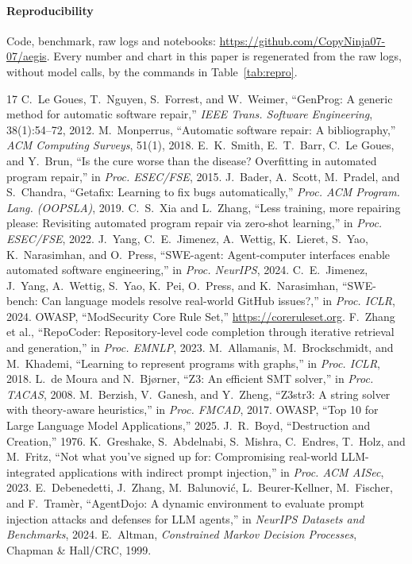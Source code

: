 \documentclass[journal]{IEEEtran}
\newcommand{\repolink}{\url{https://github.com/CopyNinja07-07/aegis}}
\begin{document}
\paragraph{Reproducibility} Code, benchmark, raw logs and notebooks: \repolink{}. Every number and chart in this paper is regenerated from the raw logs, without model calls, by the commands in Table~\ref{tab:repro}.


\begin{thebibliography}{17}
 C.~Le Goues, T.~Nguyen, S.~Forrest, and W.~Weimer, ``GenProg: A generic method for automatic software repair,'' \emph{IEEE Trans. Software Engineering}, 38(1):54--72, 2012.
 M.~Monperrus, ``Automatic software repair: A bibliography,'' \emph{ACM Computing Surveys}, 51(1), 2018.
 E.~K.~Smith, E.~T.~Barr, C.~Le Goues, and Y.~Brun, ``Is the cure worse than the disease? Overfitting in automated program repair,'' in \emph{Proc. ESEC/FSE}, 2015.
 J.~Bader, A.~Scott, M.~Pradel, and S.~Chandra, ``Getafix: Learning to fix bugs automatically,'' \emph{Proc. ACM Program. Lang. (OOPSLA)}, 2019.
 C.~S.~Xia and L.~Zhang, ``Less training, more repairing please: Revisiting automated program repair via zero-shot learning,'' in \emph{Proc. ESEC/FSE}, 2022.
 J.~Yang, C.~E.~Jimenez, A.~Wettig, K.~Lieret, S.~Yao, K.~Narasimhan, and O.~Press, ``SWE-agent: Agent-computer interfaces enable automated software engineering,'' in \emph{Proc. NeurIPS}, 2024.
 C.~E.~Jimenez, J.~Yang, A.~Wettig, S.~Yao, K.~Pei, O.~Press, and K.~Narasimhan, ``SWE-bench: Can language models resolve real-world GitHub issues?,'' in \emph{Proc. ICLR}, 2024.
 OWASP, ``ModSecurity Core Rule Set,'' \url{https://coreruleset.org}.
 F.~Zhang et al., ``RepoCoder: Repository-level code completion through iterative retrieval and generation,'' in \emph{Proc. EMNLP}, 2023.
 M.~Allamanis, M.~Brockschmidt, and M.~Khademi, ``Learning to represent programs with graphs,'' in \emph{Proc. ICLR}, 2018.
 L.~de Moura and N.~Bj{\o}rner, ``Z3: An efficient SMT solver,'' in \emph{Proc. TACAS}, 2008.
 M.~Berzish, V.~Ganesh, and Y.~Zheng, ``Z3str3: A string solver with theory-aware heuristics,'' in \emph{Proc. FMCAD}, 2017.
 OWASP, ``Top 10 for Large Language Model Applications,'' 2025.
 J.~R.~Boyd, ``Destruction and Creation,'' 1976.
 K.~Greshake, S.~Abdelnabi, S.~Mishra, C.~Endres, T.~Holz, and M.~Fritz, ``Not what you've signed up for: Compromising real-world LLM-integrated applications with indirect prompt injection,'' in \emph{Proc. ACM AISec}, 2023.
 E.~Debenedetti, J.~Zhang, M.~Balunovi\'c, L.~Beurer-Kellner, M.~Fischer, and F.~Tram\`er, ``AgentDojo: A dynamic environment to evaluate prompt injection attacks and defenses for LLM agents,'' in \emph{NeurIPS Datasets and Benchmarks}, 2024.
 E.~Altman, \emph{Constrained Markov Decision Processes}, Chapman \& Hall/CRC, 1999.
\end{thebibliography}
\end{document}
